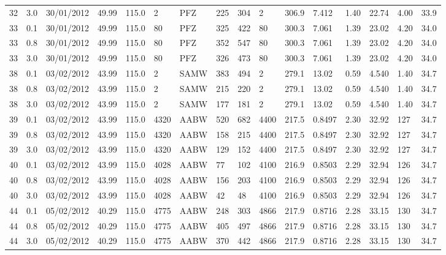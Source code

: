 {\begin{landscape}
\begin{longtable}{llllllllllllllll}
32 & 3.0 & 30/01/2012 & \textminus{}49.99 & 115.0 & 2 & PFZ & 225 & 304 & 2 & 306.9 & 7.412 & 1.40 & 22.74 & 4.00 & 33.9\\
33 & 0.1 & 30/01/2012 & \textminus{}49.99 & 115.0 & 80 & PFZ & 325 & 422 & 80 & 300.3 & 7.061 & 1.39 & 23.02 & 4.20 & 34.0\\
33 & 0.8 & 30/01/2012 & \textminus{}49.99 & 115.0 & 80 & PFZ & 352 & 547 & 80 & 300.3 & 7.061 & 1.39 & 23.02 & 4.20 & 34.0\\
33 & 3.0 & 30/01/2012 & \textminus{}49.99 & 115.0 & 80 & PFZ & 326 & 473 & 80 & 300.3 & 7.061 & 1.39 & 23.02 & 4.20 & 34.0\\
38 & 0.1 & 03/02/2012 & \textminus{}43.99 & 115.0 & 2 & SAMW & 383 & 494 & 2 & 279.1 & 13.02 & 0.59 & 4.540 & 1.40 & 34.7\\
38 & 0.8 & 03/02/2012 & \textminus{}43.99 & 115.0 & 2 & SAMW & 215 & 220 & 2 & 279.1 & 13.02 & 0.59 & 4.540 & 1.40 & 34.7\\
38 & 3.0 & 03/02/2012 & \textminus{}43.99 & 115.0 & 2 & SAMW & 177 & 181 & 2 & 279.1 & 13.02 & 0.59 & 4.540 & 1.40 & 34.7\\
39 & 0.1 & 03/02/2012 & \textminus{}43.99 & 115.0 & 4320 & AABW & 520 & 682 & 4400 & 217.5 & 0.8497 & 2.30 & 32.92 & 127 & 34.7\\
39 & 0.8 & 03/02/2012 & \textminus{}43.99 & 115.0 & 4320 & AABW & 158 & 215 & 4400 & 217.5 & 0.8497 & 2.30 & 32.92 & 127 & 34.7\\
39 & 3.0 & 03/02/2012 & \textminus{}43.99 & 115.0 & 4320 & AABW & 129 & 152 & 4400 & 217.5 & 0.8497 & 2.30 & 32.92 & 127 & 34.7\\
40 & 0.1 & 03/02/2012 & \textminus{}43.99 & 115.0 & 4028 & AABW & 77 & 102 & 4100 & 216.9 & 0.8503 & 2.29 & 32.94 & 126 & 34.7\\
40 & 0.8 & 03/02/2012 & \textminus{}43.99 & 115.0 & 4028 & AABW & 156 & 203 & 4100 & 216.9 & 0.8503 & 2.29 & 32.94 & 126 & 34.7\\
40 & 3.0 & 03/02/2012 & \textminus{}43.99 & 115.0 & 4028 & AABW & 42 & 48 & 4100 & 216.9 & 0.8503 & 2.29 & 32.94 & 126 & 34.7\\
44 & 0.1 & 05/02/2012 & \textminus{}40.29 & 115.0 & 4775 & AABW & 248 & 303 & 4866 & 217.9 & 0.8716 & 2.28 & 33.15 & 130 & 34.7\\
44 & 0.8 & 05/02/2012 & \textminus{}40.29 & 115.0 & 4775 & AABW & 405 & 497 & 4866 & 217.9 & 0.8716 & 2.28 & 33.15 & 130 & 34.7\\
44 & 3.0 & 05/02/2012 & \textminus{}40.29 & 115.0 & 4775 & AABW & 370 & 442 & 4866 & 217.9 & 0.8716 & 2.28 & 33.15 & 130 & 34.7\\

\end{longtable}
\end{landscape}}
